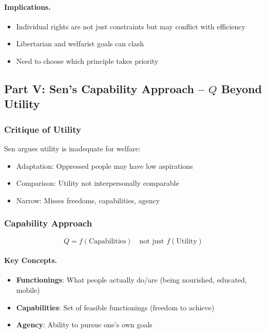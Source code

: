 \paragraph{Implications.}
\begin{itemize}
    \item Individual rights are not just constraints but may conflict with efficiency
    \item Libertarian and welfarist goals can clash
    \item Need to choose which principle takes priority
\end{itemize}

\subsection{Part V: Sen's Capability Approach – $Q$ Beyond Utility}

\subsubsection{Critique of Utility}

Sen argues utility is inadequate for welfare:
\begin{itemize}
    \item Adaptation: Oppressed people may have low aspirations
    \item Comparison: Utility not interpersonally comparable
    \item Narrow: Misses freedoms, capabilities, agency
\end{itemize}

\subsubsection{Capability Approach}

\begin{equation}
\boxed{
Q = f(\text{Capabilities}) \quad \text{not just } f(\text{Utility})
}
\label{eq:capability}
\end{equation}

\paragraph{Key Concepts.}
\begin{itemize}
    \item \textbf{Functionings}: What people actually do/are (being nourished, educated, mobile)
    \item \textbf{Capabilities}: Set of feasible functionings (freedom to achieve)
    \item \textbf{Agency}: Ability to pursue one's own goals
\end{itemize}

